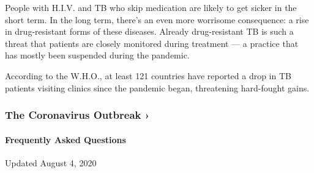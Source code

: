 People with H.I.V. and TB who skip medication are likely to get sicker
in the short term. In the long term, there's an even more worrisome
consequence: a rise in drug-resistant forms of these diseases. Already
drug-resistant TB is such a threat that patients are closely monitored
during treatment --- a practice that has mostly been suspended during
the pandemic.

According to the W.H.O., at least 121 countries have reported a drop in
TB patients visiting clinics since the pandemic began, threatening
hard-fought gains.

\href{https://www.nytimes3xbfgragh.onion/news-event/coronavirus?action=click\&pgtype=Article\&state=default\&region=MAIN_CONTENT_3\&context=storylines_faq}{}

\hypertarget{the-coronavirus-outbreak-}{%
\subsubsection{The Coronavirus Outbreak
›}\label{the-coronavirus-outbreak-}}

\hypertarget{frequently-asked-questions}{%
\paragraph{Frequently Asked
Questions}\label{frequently-asked-questions}}

Updated August 4, 2020

